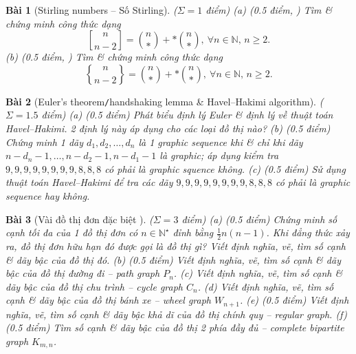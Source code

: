 \documentclass{article}
\newtheorem{baitoan}{Bài}
\newcommand{\genstirlingI}[3]{%
    \genfrac{[}{]}{0pt}{#1}{#2}{#3}%
}
\newcommand{\genstirlingII}[3]{%
    \genfrac{\{}{\}}{0pt}{#1}{#2}{#3}%
}
\newcommand{\stirlingI}[2]{\genstirlingI{}{#1}{#2}}
\newcommand{\stirlingII}[2]{\genstirlingII{}{#1}{#2}}
\begin{document}
\begin{baitoan}[Stirling numbers -- Số Stirling]
    {\rm($\Sigma = 1$ điểm)} (a) {\rm(0.5 điểm, \cite[P6.1.13]{Shahriari2022})} Tìm \& chứng minh công thức dạng
    \begin{equation*}
        \stirlingI{n}{n - 2} = \binom{n}{*} + *\binom{n}{*},\ \forall n\in\mathbb{N},\,n\ge2.
    \end{equation*}
    (b) {\rm(0.5 điểm, \cite[P6.2.7]{Shahriari2022})} Tìm \& chứng minh công thức dạng
    \begin{equation*}
        \stirlingII{n}{n - 2} = \binom{n}{*} + *\binom{n}{*},\ \forall n\in\mathbb{N},\,n\ge2.
    \end{equation*}  
\end{baitoan}

\begin{baitoan}[Euler's theorem{\tt/}handshaking lemma \& Havel--Hakimi algorithm]
    {\rm($\Sigma = 1.5$ điểm)} (a) {\rm(0.5 điểm)} Phát biểu định lý Euler \& định lý về thuật toán Havel--Hakimi. 2 định lý này áp dụng cho các loại đồ thị nào? (b) {\rm(0.5 điểm) \cite[P10.1.13, p. 368]{Shahriari2022}} Chứng minh 1 dãy $d_1,d_2,\ldots,d_n$ là 1 graphic sequence khi \& chỉ khi dãy $n - d_n - 1,\ldots,n - d_2 - 1,n - d_1 - 1$ là graphic; áp dụng kiểm tra $9,9,9,9,9,9,9,9,8,8,8$ có phải là graphic squence không. (c) {\rm(0.5 điểm)} Sử dụng thuật toán Havel--Hakimi để tra các dãy $9,9,9,9,9,9,9,9,8,8,8$ có phải là graphic sequence hay không.
\end{baitoan}

\begin{baitoan}[Vài đồ thị đơn đặc biệt \cite{Valiente2021}]
    {\rm($\Sigma = 3$ điểm)} (a) {\rm(0.5 điểm)} Chứng minh số cạnh tối đa của 1 đồ thị đơn có $n\in\mathbb{N}^\star$ đỉnh bằng $\frac{1}{2}n(n - 1)$. Khi đẳng thức xảy ra, đồ thị đơn hữu hạn đó được gọi là đồ thị gì? Viết định nghĩa, vẽ, tìm số cạnh \& dãy bậc của đồ thị đó. (b) {\rm(0.5 điểm)} Viết định nghĩa, vẽ, tìm số cạnh \& dãy bậc của đồ thị đường đi -- path graph $P_n$. (c) Viết định nghĩa, vẽ, tìm số cạnh \& dãy bậc của đồ thị chu trình -- cycle graph $C_n$. (d) Viết định nghĩa, vẽ, tìm số cạnh \& dãy bậc của đồ thị bánh xe -- wheel graph $W_{n+1}$. (e) {\rm(0.5 điểm)} Viết định nghĩa, vẽ, tìm số cạnh \& dãy bậc khả dĩ của đồ thị chính quy -- regular graph. (f) {\rm(0.5 điểm)} Tìm số cạnh \& dãy bậc của đồ thị 2 phía đầy đủ -- complete bipartite graph $K_{m,n}$.
\end{baitoan}


\printbibliography[heading=bibintoc]
    
\end{document}
